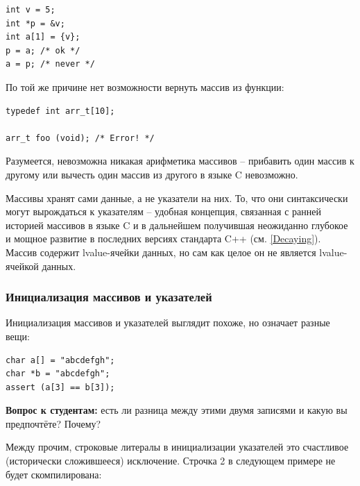 \documentclass[a4paper,12pt,oneside]{article}
\newif\ifanswers
\begin{document}
\begin{lstlisting}
int v = 5;
int *p = &v;
int a[1] = {v};
p = a; /* ok */
a = p; /* never */
\end{lstlisting}

По той же причине нет возможности вернуть массив из функции:

\begin{lstlisting}
typedef int arr_t[10];

arr_t foo (void); /* Error! */
\end{lstlisting}

Разумеется, невозможна никакая арифметика массивов -- прибавить один массив к другому или вычесть один массив из другого в языке C невозможно.

Массивы хранят сами данные, а не указатели на них. То, что они синтаксически могут вырождаться к указателям -- удобная концепция, связанная с ранней историей массивов в языке C и в дальнейшем получившая неожиданно глубокое и мощное развитие в последних версиях стандарта C++ (см. \ref{Decaying}). Массив содержит lvalue-ячейки данных, но сам как целое он не является lvalue-ячейкой данных.

\subsubsection{Инициализация массивов и указателей}

Инициализация массивов и указателей выглядит похоже, но означает разные вещи:

\begin{lstlisting}
char a[] = "abcdefgh";
char *b = "abcdefgh";
assert (a[3] == b[3]);
\end{lstlisting}

\textbf{Вопрос к студентам:} есть ли разница между этими двумя записями и какую вы предпочтёте? Почему?

\ifanswers
Верный ответ: строчка 1 предпочтительней, чем (устаревшая, с Wall + Werror выдаст ``error: deprecated conversion from string constant to \lstinline!char*!'') строчка 2 и они имеют разную семантику. Память под массивы выделяется автоматически (и строчка 1 подразумевает неявный memset) но память никогда автоматически не выделяется под указатели, поэтому для построения динамических структур данных (например, связных списков) используются указатели, а не массивы.
\fi

Между прочим, строковые литералы в инициализации указателей это счастливое (исторически сложившееся) исключение. Строчка 2 в следующем примере не будет скомпилирована:
\end{document}

